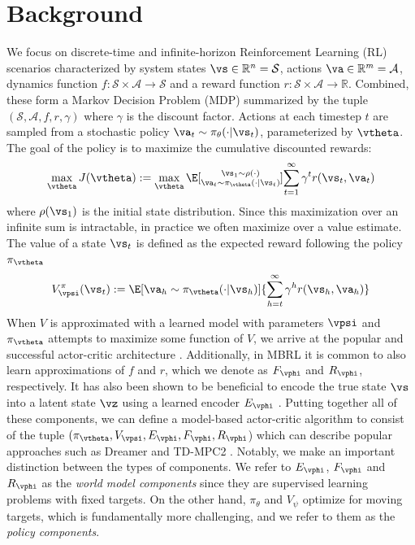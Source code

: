 \documentclass{article} %
\begin{document}
\section{Background} \label{sec:bg}

We focus on discrete-time and infinite-horizon Reinforcement Learning (RL) scenarios characterized by system states $\vs \in \mathbb{R}^n = \mathcal{S}$, actions $\va \in \mathbb{R}^m = \mathcal{A}$, dynamics function $f: \mathcal{S} \times \mathcal{A} \rightarrow \mathcal{S}$ and a reward function  $r: \mathcal{S} \times \mathcal{A} \rightarrow \mathbb{R}$. Combined, these form a Markov Decision Problem (MDP) summarized by the tuple $(\mathcal{S}, \mathcal{A}, f, r, \gamma)$ where $\gamma$ is the discount factor. Actions at each timestep $t$ are sampled from a stochastic policy $\va_t \sim \pi_\theta (\cdot | \vs_t)$, parameterized by $\vtheta$. The goal of the policy is to maximize the cumulative discounted rewards:
\vspace{-0.2cm}
\begin{align}
    \label{eq:objective}
    \max_\vtheta J(\vtheta) := \max_\vtheta \E[\substack{\vs_1 \sim \rho(\cdot) \\ \va_t \sim \pi_\vtheta (\cdot | \vs_t)}]{\sum_{t=1}^\infty \gamma^t r(\vs_t, \va_t)}
\end{align}
where $\rho(\vs_1)$ is the initial state distribution. Since this maximization over an infinite sum is intractable, in practice we often maximize over a value estimate. The value of a state $\vs_t$ is defined as the expected reward following the policy $\pi_\vtheta$
\vspace{-0.2cm}
\begin{align}
    \label{eq:value}
    V^\pi_\vpsi (\vs_t) := \E[\va_h \sim \pi_\vtheta(\cdot | \vs_h)]{\sum_{h=t}^\infty \gamma^h r(\vs_h, \va_h)}
\end{align}
When $V$ is approximated with a learned model with parameters $\vpsi$ and $\pi_\vtheta$ attempts to maximize some function of $V$, we arrive at the popular and successful actor-critic architecture \citet{konda1999actor}. Additionally, in MBRL it is common to also learn approximations of $f$ and $r$, which we denote as $F_\vphi$ and $R_\vphi$, respectively. It has also been shown to be beneficial to encode the true state $\vs$ into a latent state $\vz$ using a learned encoder $E_\vphi$ \citet{hafner2019dream,hansen2022temporal,hansen2023td,hafner2023mastering}. Putting together all of these components, we can define a model-based actor-critic algorithm to consist of the tuple $(\pi_\vtheta, V_\vpsi, E_\vphi, F_\vphi, R_\vphi$) which can describe popular approaches such as Dreamer \citet{hafner2019dream,hafner2023mastering} and TD-MPC2 \citet{hansen2023td}. Notably, we make an important distinction between the types of components. We refer to $E_\vphi$, $F_\vphi$ and $R_\vphi$ as the \textit{world model components} since they are supervised learning problems with fixed targets. On the other hand, $\pi_\theta$ and $V_\psi$ optimize for moving targets, which is fundamentally more challenging, and we refer to them as the \textit{policy components}.
\end{document}
